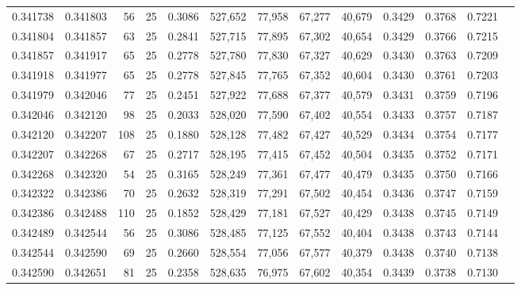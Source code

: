 \begin{tabular}{rrrrrrrrrrrrr}
0.341738 & 0.341803 &    56 &  25 &                                     0.3086 & 527,652 &  77,958 &  67,277 &  40,679 & 0.3429 & 0.3768 & 0.7221 \\
0.341804 & 0.341857 &    63 &  25 &                                     0.2841 & 527,715 &  77,895 &  67,302 &  40,654 & 0.3429 & 0.3766 & 0.7215 \\
0.341857 & 0.341917 &    65 &  25 &                                     0.2778 & 527,780 &  77,830 &  67,327 &  40,629 & 0.3430 & 0.3763 & 0.7209 \\
0.341918 & 0.341977 &    65 &  25 &                                     0.2778 & 527,845 &  77,765 &  67,352 &  40,604 & 0.3430 & 0.3761 & 0.7203 \\
0.341979 & 0.342046 &    77 &  25 &                                     0.2451 & 527,922 &  77,688 &  67,377 &  40,579 & 0.3431 & 0.3759 & 0.7196 \\
0.342046 & 0.342120 &    98 &  25 &                                     0.2033 & 528,020 &  77,590 &  67,402 &  40,554 & 0.3433 & 0.3757 & 0.7187 \\
0.342120 & 0.342207 &   108 &  25 &                                     0.1880 & 528,128 &  77,482 &  67,427 &  40,529 & 0.3434 & 0.3754 & 0.7177 \\
0.342207 & 0.342268 &    67 &  25 &                                     0.2717 & 528,195 &  77,415 &  67,452 &  40,504 & 0.3435 & 0.3752 & 0.7171 \\
0.342268 & 0.342320 &    54 &  25 &                                     0.3165 & 528,249 &  77,361 &  67,477 &  40,479 & 0.3435 & 0.3750 & 0.7166 \\
0.342322 & 0.342386 &    70 &  25 &                                     0.2632 & 528,319 &  77,291 &  67,502 &  40,454 & 0.3436 & 0.3747 & 0.7159 \\
0.342386 & 0.342488 &   110 &  25 &                                     0.1852 & 528,429 &  77,181 &  67,527 &  40,429 & 0.3438 & 0.3745 & 0.7149 \\
0.342489 & 0.342544 &    56 &  25 &                                     0.3086 & 528,485 &  77,125 &  67,552 &  40,404 & 0.3438 & 0.3743 & 0.7144 \\
0.342544 & 0.342590 &    69 &  25 &                                     0.2660 & 528,554 &  77,056 &  67,577 &  40,379 & 0.3438 & 0.3740 & 0.7138 \\
0.342590 & 0.342651 &    81 &  25 &                                     0.2358 & 528,635 &  76,975 &  67,602 &  40,354 & 0.3439 & 0.3738 & 0.7130 \\

\end{tabular}
